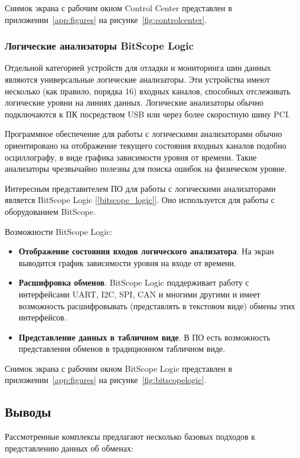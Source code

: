 Снимок экрана с рабочим окном Control Center представлен в приложении~\ref{app:figures} на рисунке~\ref{fig:controlcenter}.

\subsubsection*{Логические анализаторы BitScope Logic}

Отдельной категорией устройств для отладки и мониторинга шин данных являются универсальные логические анализаторы. Эти устройства имеют несколько (как правило, порядка 16) входных каналов, способных отслеживать логические уровни на линиях данных. Логические анализаторы обычно подключаются к ПК посредством USB или через более скоростную шину PCI.

Программное обеспечение для работы с логическими анализаторами обычно ориентировано на отображение текущего состояния входных каналов подобно осциллографу, в виде графика зависимости уровня от времени. Такие анализаторы чрезвычайно полезны для поиска ошибок на физическом уровне.

Интересным представителем ПО для работы с логическими анализаторами является BitScope Logic [\ref{bitscope_logic}]. Оно используется для работы с оборудованием BitScope.

Возможности BitScope Logic:
\begin{itemize}
 \item \textbf{Отображение состояния входов логического анализатора}. На экран выводится график зависимости уровня на входе от времени.
 \item \textbf{Расшифровка обменов}. BitScope Logic поддерживает работу с интерфейсами UART, I2C, SPI, CAN и многими другими и имеет возможность расшифровывать (представлять в текстовом виде) обмены этих интерфейсов.
 \item \textbf{Представление данных в табличном виде}. В ПО есть возможность представления обменов в традиционном табличном виде.
\end{itemize}

Снимок экрана с рабочим окном BitScope Logic представлен в приложении~\ref{app:figures} на рисунке~\ref{fig:bitscopelogic}.

\subsection{Выводы}

Рассмотренные комплексы предлагают несколько базовых подходов к представлению данных об обменах:

